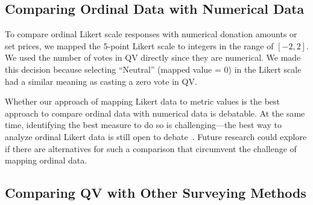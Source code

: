 \subsection{Comparing Ordinal Data with Numerical Data}
To compare ordinal Likert scale responses with numerical donation amounts or set prices, we mapped the 5-point Likert scale to integers in the range of $[-2, 2]$. We used the number of votes in QV directly since they are numerical. We made this decision because selecting ``Neutral'' (mapped value = 0) in the Likert scale had a similar meaning as casting a zero vote in QV.

Whether our approach of mapping Likert data to metric values is the best approach to compare ordinal data with numerical data is debatable. At the same time, identifying the best measure to do so is challenging---the best way to analyze ordinal Likert data is still open to debate~\cite{gob2007ordinal}. Future research could explore if there are alternatives for such a comparison that circumvent the challenge of mapping ordinal data. 

\subsection{Comparing QV with Other Surveying Methods}

